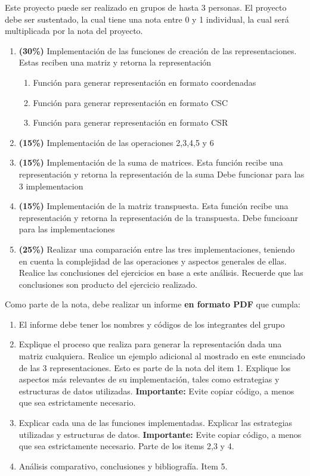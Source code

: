 \documentclass[onecolumn]{article}
\begin{document}
Este proyecto puede ser realizado en grupos de hasta 3 personas. El proyecto debe ser sustentado, la cual tiene una nota entre 0 y 1 individual, la cual será multiplicada por la nota del proyecto.

\begin{enumerate}
	\item \textbf{(30\%)} Implementación de las funciones de creación de las representaciones. Estas reciben una matriz y retorna la representación
	\begin{enumerate}
		\item Función para generar representación en formato coordenadas
		\item Función para generar representación en formato CSC
		\item Función para generar representación en formato CSR
	\end{enumerate}
	\item \textbf{(15\%)} Implementación de las operaciones 2,3,4,5 y 6
	\item \textbf{(15\%)} Implementación de la suma de matrices. Esta función recibe una representación y retorna la representación de la suma Debe funcionar para las 3 implementacion
	\item \textbf{(15\%)} Implementación de la matriz transpuesta. Esta función recibe una representación y retorna la representación de la transpuesta. Debe funcioanr para las implementaciones
	\item \textbf{(25\%)} Realizar una comparación entre las tres implementaciones, teniendo en cuenta la complejidad de las operaciones y aspectos generales de ellas. Realice las conclusiones del ejercicios en base a este análisis. Recuerde que las conclusiones son producto del ejercicio realizado.
\end{enumerate}

Como parte de la nota, debe realizar un informe \textbf{en formato PDF} que cumpla:

\begin{enumerate}
	\item El informe debe tener los nombres y códigos de los integrantes del grupo
	\item Explique el proceso que realiza para generar la representación dada una matriz cualquiera. Realice un ejemplo adicional al mostrado en este enunciado de las 3 representaciones. Esto es parte de la nota del item 1. Explique los aspectos más relevantes de su implementación, tales como estrategias y estructuras de datos utilizadas.  \textbf{Importante:} Evite copiar código, a menos que sea estrictamente necesario.
	\item Explicar cada una de las funciones implementadas. Explicar las estrategias utilizadas y estructuras de datos. \textbf{Importante:} Evite copiar código, a menos que sea estrictamente necesario. Parte de los items 2,3 y 4.
	\item Análisis comparativo, conclusiones y bibliografía. Item 5.
\end{enumerate}
\end{document}
